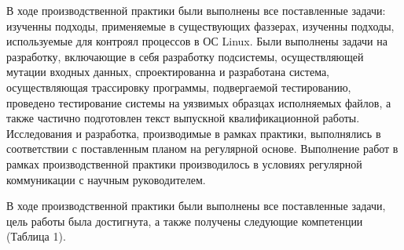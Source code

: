\label{sec:conclusion}

В ходе производственной практики были выполнены все поставленные задачи: изученны подходы, применяемые в существующих фаззерах, изученны подходы, используемые для контроял процессов в ОС Linux. Были выполнены задачи на разработку, включающие в себя разработку подсистемы, осуществляющей мутации входных данных, спроектированна и разработана система, осуществляющая трассировку программы, подвергаемой тестированию, проведено тестирование системы на уязвимых образцах исполняемых файлов, а также частично подготовлен текст выпускной квалификационной работы. Исследования и разработка, производимые в рамках практики, выполнялись в соответствии с поставленным планом на регулярной основе. Выполнение работ в рамках производственной практики производилось в условиях регулярной коммуникации с научным руководителем.

В ходе производственной практики были выполнены все поставленные задачи, цель работы была достигнута, а также получены следующие компетенции (Таблица 1).

